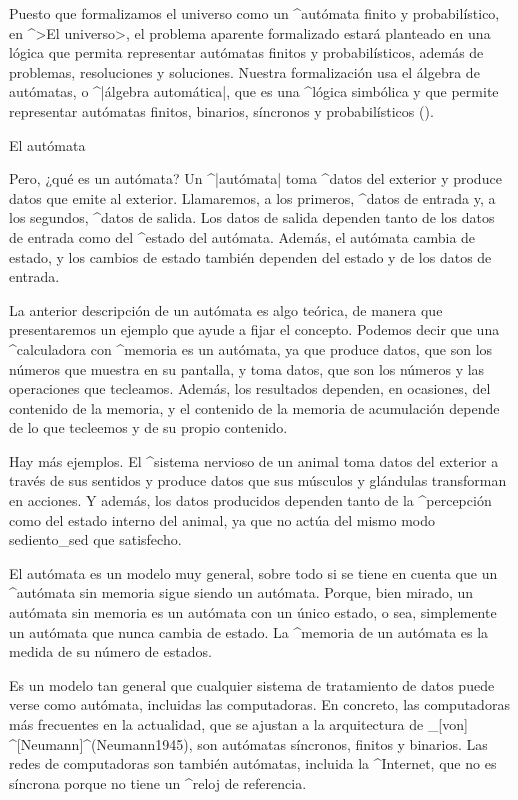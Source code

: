Puesto que formalizamos el universo como un ^{autómata} finito y
probabilístico, en ^>El universo>, el problema aparente formalizado
estará planteado en una lógica que permita representar autómatas finitos
y probabilísticos, además de problemas, resoluciones y soluciones.
Nuestra formalización usa el álgebra de autómatas, o ^|álgebra
automática|, que es una ^{lógica simbólica} y que permite representar
autómatas finitos, binarios, síncronos y probabilísticos ().


\Section El autómata

Pero, ¿qué es un autómata? Un ^|autómata| toma ^{datos} del exterior y
produce datos que emite al exterior. Llamaremos, a los primeros, ^{datos
de entrada} y, a los segundos, ^{datos de salida}. Los datos de salida
dependen tanto de los datos de entrada como del ^{estado} del autómata.
Además, el autómata cambia de estado, y los cambios de estado también
dependen del estado y de los datos de entrada.

La anterior descripción de un autómata es algo teórica, de manera que
presentaremos un ejemplo que ayude a fijar el concepto. Podemos decir
que una ^{calculadora} con ^{memoria} es un autómata, ya que produce
datos, que son los números que muestra en su pantalla, y toma datos, que
son los números y las operaciones que tecleamos. Además, los resultados
dependen, en ocasiones, del contenido de la memoria, y el contenido de
la memoria de acumulación depende de lo que tecleemos y de su propio
contenido.

Hay más ejemplos. El ^{sistema nervioso} de un animal toma datos
del exterior a través de sus sentidos y produce datos que sus músculos y
glándulas transforman en acciones. Y además, los datos producidos
dependen tanto de la ^{percepción} como del estado interno del animal,
ya que no actúa del mismo modo sediento_{sed} que satisfecho.

El autómata es un modelo muy general, sobre todo si se tiene en cuenta
que un ^{autómata sin memoria} sigue siendo un autómata. Porque, bien
mirado, un autómata sin memoria es un autómata con un único estado, o
sea, simplemente un autómata que nunca cambia de estado. La ^{memoria}
de un autómata es la medida de su número de estados.

Es un modelo tan general que cualquier sistema de tratamiento de datos
puede verse como autómata, incluidas las computadoras. En concreto, las
computadoras más frecuentes en la actualidad, que se ajustan a la
arquitectura de _[von] ^[Neumann]^(Neumann1945), son autómatas
síncronos, finitos y binarios. Las redes de computadoras son también
autómatas, incluida la ^{Internet}, que no es síncrona porque no tiene
un ^{reloj} de referencia.

